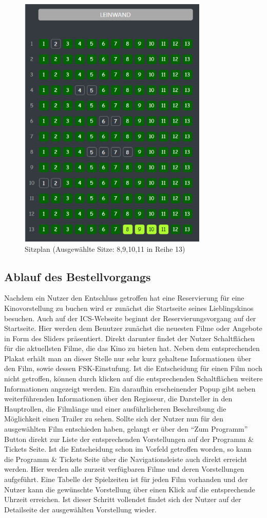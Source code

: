	\begin{figure}[H]
		\centering 
		\includegraphics[width=9cm]{img/sitzplan.png}
		\captionsetup{format=hang}
		\caption[Sitzplan]{\label{fig:sitzplan} Sitzplan (Ausgewählte Sitze: 8,9,10,11 in Reihe 13)}
	\end{figure}

	\subsection{Ablauf des Bestellvorgangs}
	Nachdem ein Nutzer den Entschluss getroffen hat eine Reservierung für eine Kinovorstellung zu buchen wird er zunächst die Startseite seines Lieblingskinos besuchen. Auch auf der ICS-Webseite beginnt der Reservierungsvorgang auf der Startseite. Hier werden dem Benutzer zunächst die neuesten Filme oder Angebote in Form des Sliders präsentiert. Direkt darunter findet der Nutzer Schaltflächen für die aktuellsten Filme, die das Kino zu bieten hat. Neben dem entsprechenden Plakat erhält man an dieser Stelle nur sehr kurz gehaltene Informationen über den Film, sowie dessen FSK-Einstufung. Ist die Entscheidung für einen Film noch nicht getroffen, können durch klicken auf die entsprechenden Schaltflächen weitere Informationen angezeigt werden. Ein daraufhin erscheinender Popup gibt neben weiterführenden Informationen über den Regisseur, die Darsteller in den Hauptrollen, die Filmlänge und einer ausführlicheren Beschreibung die Möglichkeit einen Trailer zu sehen. Sollte sich der Nutzer nun für den ausgewählten Film entschieden haben, gelangt er über den \enquote{Zum Programm} Button direkt zur Liste der entsprechenden Vorstellungen auf der Programm \& Tickets Seite. Ist die Entscheidung schon im Vorfeld getroffen worden, so kann die Programm \& Tickets Seite über die Navigationsleiste auch direkt erreicht werden. Hier werden alle zurzeit verfügbaren Filme und deren Vorstellungen aufgeführt. Eine Tabelle der Spielzeiten ist für jeden Film vorhanden und der Nutzer kann die gewünschte Vorstellung über einen Klick auf die entsprechende Uhrzeit erreichen. Ist dieser Schritt vollendet findet sich der Nutzer auf der Detailseite der ausgewählten Vorstellung wieder. 
	
